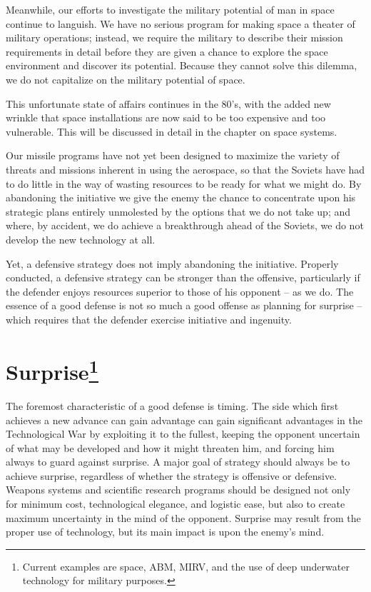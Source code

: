 Meanwhile, our efforts to investigate the military potential of man in space continue to languish. We have no serious program for making space a theater of military operations; instead, we require the military to describe their mission requirements in detail before they are given a chance to explore the space environment and discover its potential. Because they cannot solve this dilemma, we do not capitalize on the military potential of space.

This unfortunate state of affairs continues in the 80's, with the added new wrinkle that space installations are now said to be too expensive and too vulnerable. This will be discussed in detail in the chapter on space systems.

Our missile programs have not yet been designed to maximize the variety of threats and missions inherent in using the aerospace, so that the Soviets have had to do little in the way of wasting resources to be ready for what we might do. By abandoning the initiative we give the enemy the chance to concentrate upon his strategic plans entirely unmolested by the options that we do not take up; and where, by accident, we do achieve a breakthrough ahead of the Soviets, we do not develop the new technology at all.

Yet, a defensive strategy does not imply abandoning the initiative. Properly conducted, a defensive strategy can be stronger than the offensive, particularly if the defender enjoys resources superior to those of his opponent -- as we do. The essence of a good defense is not so much a good offense as planning for surprise -- which requires that the defender exercise initiative and ingenuity.

\section{Surprise\footnote{
    Current examples are space, ABM, MIRV, and the use of deep underwater technology for military purposes.}
}

The foremost characteristic of a good defense is timing. The side which first achieves a new advance can gain advantage can gain significant advantages in the Technological War by exploiting it to the fullest, keeping the opponent uncertain of what may be developed and how it might threaten him, and forcing him always to guard against surprise. A major goal of strategy should always be to achieve surprise, regardless of whether the strategy is offensive or defensive. Weapons systems and scientific research programs should be designed not only for minimum cost, technological elegance, and logistic ease, but also to create maximum uncertainty in the mind of the opponent. Surprise may result from the proper use of technology, but its main impact is upon the enemy's mind.

